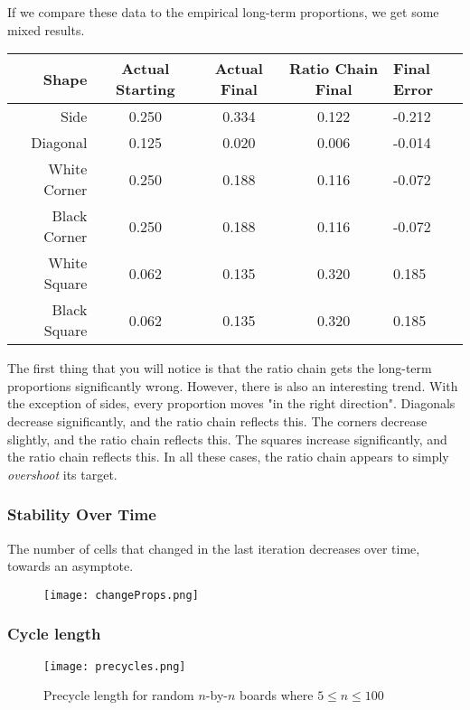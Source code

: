 \documentclass[12pt]{article}
\theoremstyle{definition}
\theoremstyle{remark}
\theoremstyle{remark}
\begin{document}
\par
If we compare these data to the empirical long-term proportions, we get some mixed results.

\begin{table}[H]
\begin{tabular}{r|c c c | l}
  Shape & Actual Starting & Actual Final & Ratio Chain Final & Final Error \\ \hline
  Side & 0.250 & 0.334 & 0.122 & -0.212 \\
  Diagonal & 0.125 & 0.020 & 0.006 & -0.014 \\
  White Corner & 0.250 & 0.188 & 0.116 & -0.072 \\
  Black Corner & 0.250 & 0.188 & 0.116 & -0.072 \\
  White Square & 0.062 & 0.135 & 0.320 & 0.185 \\
  Black Square & 0.062 & 0.135 & 0.320 & 0.185 \\
\end{tabular}
\end{table}
\par The first thing that you will notice is that the ratio chain gets the long-term proportions significantly wrong. However, there is also an interesting trend. With the exception of sides, every proportion moves "in the right direction". Diagonals decrease significantly, and the ratio chain reflects this. The corners decrease slightly, and the ratio chain reflects this. The squares increase significantly, and the ratio chain reflects this. In all these cases, the ratio chain appears to simply \textit{overshoot} its target.

\subsubsection{Stability Over Time}
The number of cells that changed in the last iteration decreases over time, towards an asymptote.

\begin{figure}[H]
  \centering
  \texttt{[image: changeProps.png]}
  \caption{}
\end{figure}

\subsubsection{Cycle length}

\begin{figure}[H]
  \texttt{[image: precycles.png]}
  \caption{Precycle length for random $n$-by-$n$ boards where $5\leq n \leq 100$}
\end{figure} %
\end{document}
